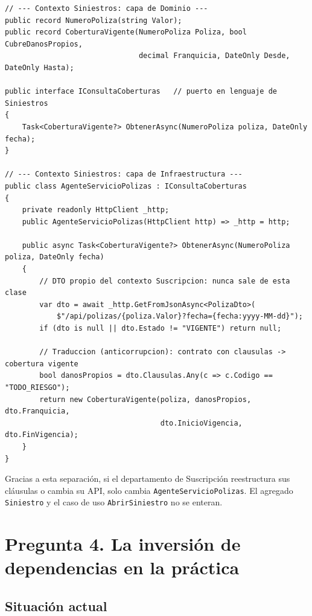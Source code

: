 \documentclass[11pt,a4paper]{article}
\begin{document}
\begin{lstlisting}[caption={Puerto definido en el dominio de Siniestros y Agente de Servicio en infraestructura (simplificado).}]
// --- Contexto Siniestros: capa de Dominio ---
public record NumeroPoliza(string Valor);
public record CoberturaVigente(NumeroPoliza Poliza, bool CubreDanosPropios,
                               decimal Franquicia, DateOnly Desde, DateOnly Hasta);

public interface IConsultaCoberturas   // puerto en lenguaje de Siniestros
{
    Task<CoberturaVigente?> ObtenerAsync(NumeroPoliza poliza, DateOnly fecha);
}

// --- Contexto Siniestros: capa de Infraestructura ---
public class AgenteServicioPolizas : IConsultaCoberturas
{
    private readonly HttpClient _http;
    public AgenteServicioPolizas(HttpClient http) => _http = http;

    public async Task<CoberturaVigente?> ObtenerAsync(NumeroPoliza poliza, DateOnly fecha)
    {
        // DTO propio del contexto Suscripcion: nunca sale de esta clase
        var dto = await _http.GetFromJsonAsync<PolizaDto>(
            $"/api/polizas/{poliza.Valor}?fecha={fecha:yyyy-MM-dd}");
        if (dto is null || dto.Estado != "VIGENTE") return null;

        // Traduccion (anticorrupcion): contrato con clausulas -> cobertura vigente
        bool danosPropios = dto.Clausulas.Any(c => c.Codigo == "TODO_RIESGO");
        return new CoberturaVigente(poliza, danosPropios, dto.Franquicia,
                                    dto.InicioVigencia, dto.FinVigencia);
    }
}
\end{lstlisting}

Gracias a esta separación, si el departamento de Suscripción reestructura sus cláusulas o cambia su API, solo cambia \texttt{AgenteServicioPolizas}. El agregado \texttt{Siniestro} y el caso de uso \texttt{AbrirSiniestro} no se enteran.

\section{Pregunta 4. La inversión de dependencias en la práctica}

\subsection{Situación actual}
\end{document}

